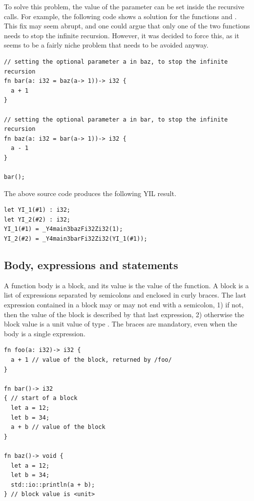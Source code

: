 To solve this problem, the value of the parameter  can be set inside
the recursive calls. For example, the following code shows a solution for the
functions  and . This fix may seem abrupt, and one could
argue that only one of the two functions needs to stop the infinite recursion.
However, it was decided to force this, as it seems to be a fairly niche problem
that needs to be avoided anyway.

\begin{lstlisting}[style=coloredverbatim]
// setting the optional parameter a in baz, to stop the infinite recursion
fn bar(a: i32 = baz(a-> 1))-> i32 {
  a + 1
}

// setting the optional parameter a in bar, to stop the infinite recursion
fn baz(a: i32 = bar(a-> 1))-> i32 {
  a - 1
}

bar();
\end{lstlisting}

The above source code produces the following YIL result.

\begin{lstlisting}[style=lyilVerb]
let YI_1(#1) : i32;
let YI_2(#2) : i32;
YI_1(#1) = _Y4main3bazFi32Zi32(1);
YI_2(#2) = _Y4main3barFi32Zi32(YI_1(#1));
\end{lstlisting}

\subsection{Body, expressions and statements}
\label{sec:global:function_body}

A function body is a block, and its value is the value of the function. A
block is a list of expressions separated by semicolons and enclosed in curly
braces. The last expression contained in a block may or may not end with a
semicolon, 1) if not, then the value of the block is described by that last
expression, 2) otherwise the block value is a unit value of type .
The braces are mandatory, even when the body is a single expression.

\begin{lstlisting}[style=coloredverbatim]
fn foo(a: i32)-> i32 {
  a + 1 // value of the block, returned by /foo/
}

fn bar()-> i32
{ // start of a block
  let a = 12;
  let b = 34;
  a + b // value of the block
}

fn baz()-> void {
  let a = 12;
  let b = 34;
  std::io::println(a + b);
} // block value is <unit>

\end{lstlisting}

